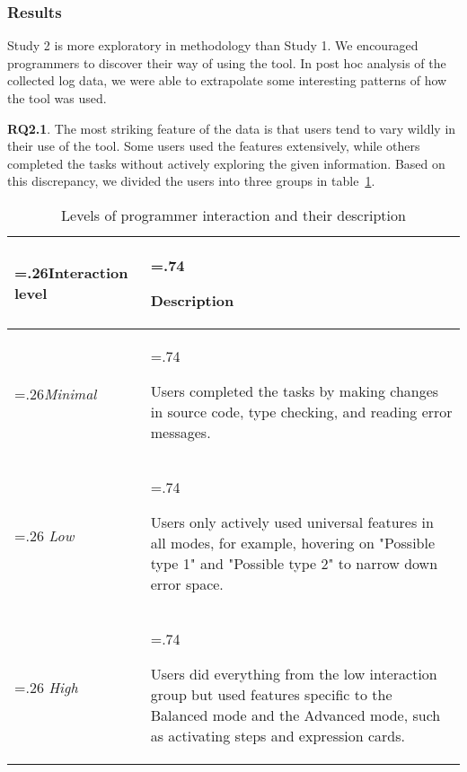 \subsubsection*{\textbf{Results}} 

Study 2 is more exploratory in methodology than Study 1. We encouraged programmers  to discover their way of using the tool. In post hoc analysis of the collected log data, we were able to extrapolate some interesting patterns of how the tool was used. 


\textbf{RQ2.1}. The most striking feature of the data is that users tend to vary wildly in their use of the tool. Some users used the features extensively, while others completed the tasks without actively exploring the given information. Based on this discrepancy, we divided the users into three groups in table~\ref{tab:interaction-level}.
\begin{table}
    \centering
\begin{scriptsize}
\begin{small}
\noindent\begin{tabularx}{\linewidth}{ 
  | >{\hsize=.26\hsize}X 
  | >{\hsize=.74\hsize \raggedright\arraybackslash}X  | }
    \hline
        Interaction level & Description \\ \hline
        \textit{Minimal}  & Users completed the tasks by making changes in source code, type checking, and reading error messages. \\ \hline
        \textit{Low}  & Users only actively used universal features in all modes, for example, hovering on "Possible type 1" and "Possible type 2" to narrow down error space. \\ \hline
        \textit{High}  & Users did everything from the low interaction group but used features specific to the Balanced mode and the Advanced mode, such as activating steps and expression cards. \\ \hline
\end{tabularx}
\end{small}
\end{scriptsize}
    \caption{Levels of programmer interaction and their description}
    \label {tab:interaction-level}
\end{table}

